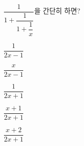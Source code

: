 \hspace*{2mm}\begin{minipage}[t]{\dimexpr\linewidth-2mm\relax}\vspace{0pt}
$\dfrac{1}{1+\dfrac{1}{1+\dfrac{1}{x}}}$을 간단히 하면?
\begin{choices32}{\rule[-3ex]{0pt}{8ex}$\dfrac{1}{2x-1}$}{\rule[-3ex]{0pt}{8ex}$\dfrac{x}{2x-1}$}{\rule[-3ex]{0pt}{8ex}$\dfrac{1}{2x+1}$}{\rule[-3ex]{0pt}{8ex}$\dfrac{x+1}{2x+1}$}{\rule[-3ex]{0pt}{8ex}$\dfrac{x+2}{2x+1}$}\end{choices32}\end{minipage}
